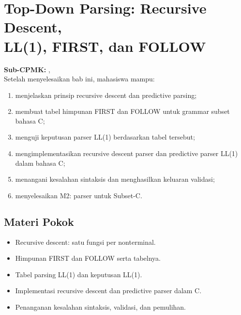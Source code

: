 \documentclass[../../main.tex]{subfiles}
\begin{document}
\chapter[Top-Down Parsing]{Top-Down Parsing: Recursive Descent,\\ LL(1), FIRST, dan FOLLOW}
\label{chap:top-down}

\begin{outcomebox}
\textbf{Sub-CPMK:} , \\[3pt]
Setelah menyelesaikan bab ini, mahasiswa mampu:
\begin{enumerate}[label=\arabic*.,leftmargin=*]
  \item menjelaskan prinsip recursive descent dan predictive parsing;
  \item membuat tabel himpunan FIRST dan FOLLOW untuk grammar subset
        bahasa C;
  \item menguji keputusan parser LL(1) berdasarkan tabel tersebut;
  \item mengimplementasikan recursive descent parser dan predictive
        parser LL(1) dalam bahasa C;
  \item menangani kesalahan sintaksis dan menghasilkan keluaran
        validasi;
  \item menyelesaikan M2: parser untuk Subset-C.
\end{enumerate}
\end{outcomebox}

\section*{Materi Pokok}
\begin{itemize}[leftmargin=*]
  \item Recursive descent: satu fungsi per nonterminal.
  \item Himpunan FIRST dan FOLLOW serta tabelnya.
  \item Tabel parsing LL(1) dan keputusan LL(1).
  \item Implementasi recursive descent dan predictive parser dalam C.
  \item Penanganan kesalahan sintaksis, validasi, dan pemulihan.
\end{itemize}















\ifSubfilesClassLoaded{%
}{}
\end{document}
